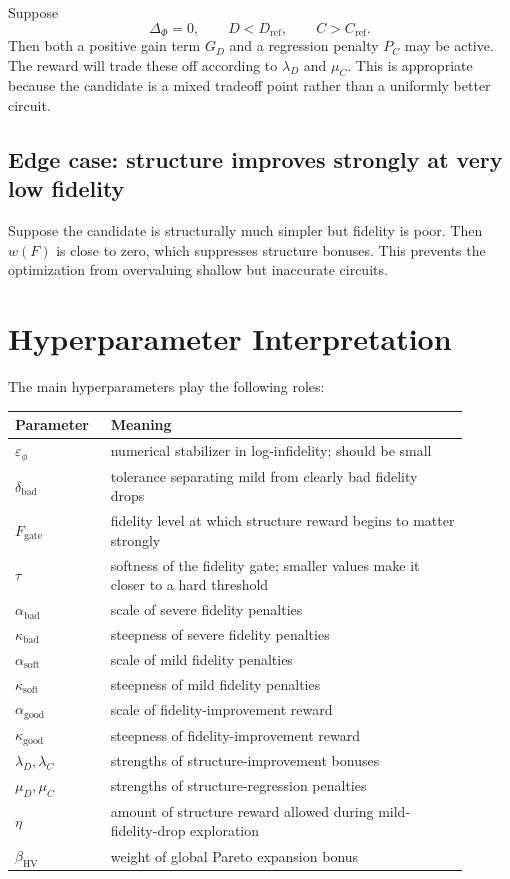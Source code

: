 \documentclass[11pt]{article}
\begin{document}
Suppose
\begin{equation}
    \Delta_{\Phi}=0,
    \qquad
    D<D_{\mathrm{ref}},
    \qquad
    C>C_{\mathrm{ref}}.
\end{equation}
Then both a positive gain term $G_D$ and a regression penalty $P_C$ may be active.
The reward will trade these off according to $\lambda_D$ and $\mu_C$.
This is appropriate because the candidate is a mixed tradeoff point rather than a uniformly better circuit.

\subsection{Edge case: structure improves strongly at very low fidelity}

Suppose the candidate is structurally much simpler but fidelity is poor. Then $w(F)$ is close to zero, which suppresses structure bonuses. This prevents the optimization from overvaluing shallow but inaccurate circuits.

\section{Hyperparameter Interpretation}

The main hyperparameters play the following roles:
\begin{center}
\begin{tabular}{>{\raggedright\arraybackslash}p{0.18\linewidth}>{\raggedright\arraybackslash}p{0.72\linewidth}}
\toprule
Parameter & Meaning \\
\midrule
$\varepsilon_{\phi}$ & numerical stabilizer in log-infidelity; should be small \\
$\delta_{\mathrm{bad}}$ & tolerance separating mild from clearly bad fidelity drops \\
$F_{\mathrm{gate}}$ & fidelity level at which structure reward begins to matter strongly \\
$\tau$ & softness of the fidelity gate; smaller values make it closer to a hard threshold \\
$\alpha_{\mathrm{bad}}$ & scale of severe fidelity penalties \\
$\kappa_{\mathrm{bad}}$ & steepness of severe fidelity penalties \\
$\alpha_{\mathrm{soft}}$ & scale of mild fidelity penalties \\
$\kappa_{\mathrm{soft}}$ & steepness of mild fidelity penalties \\
$\alpha_{\mathrm{good}}$ & scale of fidelity-improvement reward \\
$\kappa_{\mathrm{good}}$ & steepness of fidelity-improvement reward \\
$\lambda_D,\lambda_C$ & strengths of structure-improvement bonuses \\
$\mu_D,\mu_C$ & strengths of structure-regression penalties \\
$\eta$ & amount of structure reward allowed during mild-fidelity-drop exploration \\
$\beta_{\mathrm{HV}}$ & weight of global Pareto expansion bonus \\
\bottomrule
\end{tabular}
\end{center}
\end{document}
